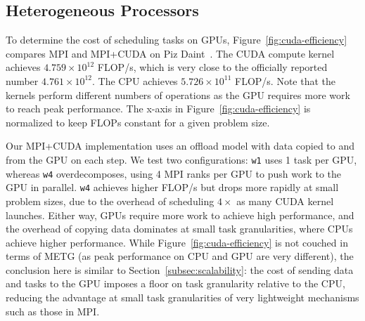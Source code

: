 \subsection{Heterogeneous Processors}



To determine the cost of scheduling tasks on GPUs, Figure~\ref{fig:cuda-efficiency} compares MPI
and MPI+CUDA on Piz Daint~\cite{PizDaint}. The CUDA
compute kernel achieves $4.759 \times 10^{12}$
FLOP/s, which is very close to the officially reported number
$4.761 \times 10^{12}$. The CPU achieves $5.726 \times 10^{11}$
FLOP/s. Note that the kernels perform different numbers of
operations as the GPU requires more work to reach peak
performance. The x-axis in Figure~\ref{fig:cuda-efficiency} is
normalized to keep FLOPs constant for a given problem
size.

Our MPI+CUDA implementation uses an offload model with data copied to and from the GPU on each step. We test
two configurations: \lstinline{w1} uses 1 task per GPU, whereas
\lstinline{w4} overdecomposes, using 4 MPI
ranks per GPU to push work to the GPU in parallel.
\lstinline{w4} achieves higher FLOP/s but
drops more rapidly at small problem sizes, due to the overhead of
scheduling $4\times$ as many CUDA kernel launches. Either way,
GPUs require more work to achieve high performance, and the overhead
of copying data dominates at small task
granularities, where CPUs achieve higher
performance. While Figure~\ref{fig:cuda-efficiency} is not couched in
terms of METG (as peak performance on CPU and GPU are very
different), the conclusion here is similar to
Section~\ref{subsec:scalability}: the cost of sending data and
tasks to the GPU imposes a floor on task granularity relative to the CPU, reducing the advantage at small task granularities of
very lightweight mechanisms such as those in MPI.
